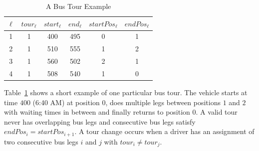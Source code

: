 \documentclass[]{amsart}
\newcommand{\lucas}[1]{{\color{red}#1}}
\theoremstyle{plain}
\begin{document}
\begin{table}[ht]
	\centering
	\begin{tabular}{*6{c}}
		\toprule
		$\ell$ & $\mathit{tour}_\ell$ & $\mathit{start}_\ell$ & $\mathit{end}_\ell$ & $\mathit{startPos}_\ell$ & $\mathit{endPos}_\ell$ \\
		\midrule
		1 & 1 & 400 & 495 & 0 & 1 \\
		2 & 1 & 510 & 555 & 1 & 2 \\
		3 & 1 & 560 & 502 & 2 & 1 \\
		4 & 1 & 508 & 540 & 1 & 0 \\
		\bottomrule
	\end{tabular}
    \caption{A Bus Tour Example}
	\label{tab:example}
\end{table}

Table~\ref{tab:example} shows a short example of one particular bus tour. The vehicle starts at time $400$ (6:40 AM) at position $0$, does multiple legs between positions $1$ and $2$ with waiting times in between and finally returns to position $0$. A valid tour never has overlapping bus legs and consecutive bus legs satisfy $\mathit{endPos}_i=\mathit{startPos}_{i+1}$. A tour change occurs when a driver has an assignment of two consecutive bus legs $i$ and $j$ with $\mathit{tour}_i\neq\mathit{tour}_j$. %
\end{document}

